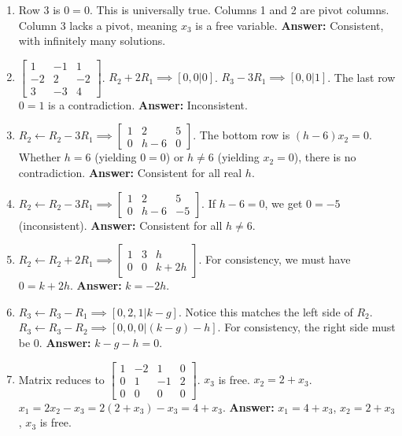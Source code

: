 \documentclass[11pt]{article}
\begin{document}
\begin{enumerate}[label=\textbf{Sol 1.1.\arabic*}]
    \item Row 3 is $0=0$. This is universally true. Columns 1 and 2 are pivot columns. Column 3 lacks a pivot, meaning $x_3$ is a free variable. \textbf{Answer:} Consistent, with infinitely many solutions.
    \item $\left[\begin{array}{cc|c} 1 & -1 & 1 \\ -2 & 2 & -2 \\ 3 & -3 & 4 \end{array}\right]$. $R_2+2R_1 \implies [0, 0 | 0]$. $R_3-3R_1 \implies [0, 0 | 1]$. The last row $0=1$ is a contradiction. \textbf{Answer:} Inconsistent.
    \item $R_2 \leftarrow R_2 - 3R_1 \implies \left[\begin{array}{cc|c} 1 & 2 & 5 \\ 0 & h-6 & 0 \end{array}\right]$. The bottom row is $(h-6)x_2 = 0$. Whether $h=6$ (yielding $0=0$) or $h \neq 6$ (yielding $x_2=0$), there is no contradiction. \textbf{Answer:} Consistent for all real $h$.
    \item $R_2 \leftarrow R_2 - 3R_1 \implies \left[\begin{array}{cc|c} 1 & 2 & 5 \\ 0 & h-6 & -5 \end{array}\right]$. If $h-6=0$, we get $0=-5$ (inconsistent). \textbf{Answer:} Consistent for all $h \neq 6$.
    \item $R_2 \leftarrow R_2 + 2R_1 \implies \left[\begin{array}{cc|c} 1 & 3 & h \\ 0 & 0 & k+2h \end{array}\right]$. For consistency, we must have $0 = k + 2h$. \textbf{Answer:} $k = -2h$.
    \item $R_3 \leftarrow R_3 - R_1 \implies [0, 2, 1 | k-g]$. Notice this matches the left side of $R_2$. $R_3 \leftarrow R_3 - R_2 \implies [0, 0, 0 | (k-g) - h]$. For consistency, the right side must be 0. \textbf{Answer:} $k - g - h = 0$.
    \item Matrix reduces to $\left[\begin{array}{ccc|c} 1 & -2 & 1 & 0 \\ 0 & 1 & -1 & 2 \\ 0 & 0 & 0 & 0 \end{array}\right]$. $x_3$ is free. $x_2 = 2 + x_3$. $x_1 = 2x_2 - x_3 = 2(2+x_3) - x_3 = 4 + x_3$. \textbf{Answer:} $x_1 = 4 + x_3$, $x_2 = 2 + x_3$, $x_3$ is free.

\end{enumerate}
\end{document}
